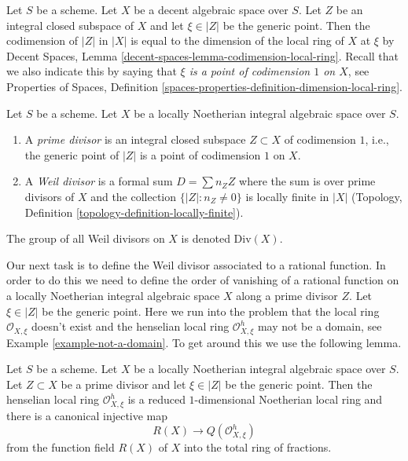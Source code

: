 \noindent
Let $S$ be a scheme. Let $X$ be a decent algebraic space over $S$.
Let $Z$ be an integral closed subspace of $X$ and let
$\xi \in |Z|$ be the generic point. Then the codimension of
$|Z|$ in $|X|$ is equal to the dimension of the local ring
of $X$ at $\xi$ by
Decent Spaces, Lemma \ref{decent-spaces-lemma-codimension-local-ring}.
Recall that we also indicate this by saying that
{\it $\xi$ is a point of codimension $1$ on $X$}, see
Properties of Spaces, Definition
\ref{spaces-properties-definition-dimension-local-ring}.

\begin{definition}
\label{definition-Weil-divisor}
Let $S$ be a scheme.
Let $X$ be a locally Noetherian integral algebraic space over $S$.
\begin{enumerate}
\item A {\it prime divisor} is an integral closed subspace $Z \subset X$
of codimension $1$, i.e., the generic point of $|Z|$ is a point
of codimension $1$ on $X$.
\item A {\it Weil divisor} is a formal sum $D = \sum n_Z Z$ where
the sum is over prime divisors of $X$ and the collection
$\{|Z| : n_Z \not = 0\}$ is locally finite in $|X|$
(Topology, Definition \ref{topology-definition-locally-finite}).
\end{enumerate}
The group of all Weil divisors on $X$ is denoted $\text{Div}(X)$.
\end{definition}

\noindent
Our next task is to define the Weil divisor associated to a rational
function. In order to do this we need to define the order of vanishing of a
rational function on a locally Noetherian integral algebraic space $X$
along a prime divisor $Z$. Let $\xi \in |Z|$ be the generic point.
Here we run into the problem that the local ring $\mathcal{O}_{X, \xi}$
doesn't exist and the henselian local ring $\mathcal{O}_{X, \xi}^h$
may not be a domain, see Example \ref{example-not-a-domain}.
To get around this we use the following lemma.

\begin{lemma}
\label{lemma-order-vanishing}
Let $S$ be a scheme. Let $X$ be a locally Noetherian integral algebraic space
over $S$. Let $Z \subset X$ be a prime divisor and let $\xi \in |Z|$ be
the generic point. Then the henselian local ring $\mathcal{O}_{X, \xi}^h$
is a reduced $1$-dimensional Noetherian local ring and
there is a canonical injective map
$$
R(X) \longrightarrow Q(\mathcal{O}_{X, \xi}^h)
$$
from the function field $R(X)$ of $X$ into the total ring of fractions.
\end{lemma}

